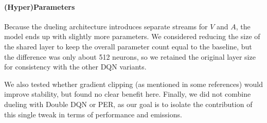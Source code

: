 \paragraph{(Hyper)Parameters}
Because the dueling architecture introduces separate streams for $V$ and $A$, the model ends up
with slightly more parameters. We considered reducing the size of the shared layer to keep the
overall parameter count equal to the baseline, but the difference was only about 512 neurons,
so we retained the original layer size for consistency with the other DQN variants.

We also tested whether gradient clipping (as mentioned in some references) would improve
stability, but found no clear benefit here.
Finally, we did not combine dueling with Double DQN or PER, as our goal is to isolate the contribution
of this single tweak in terms of performance and emissions.

